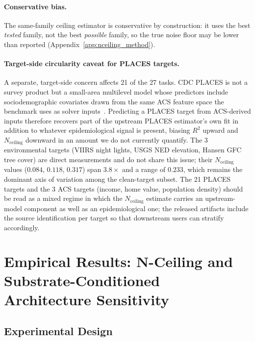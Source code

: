\documentclass{article}
\begin{document}
\paragraph{Conservative bias.} The same-family ceiling estimator is conservative by construction: it uses the best \emph{tested} family, not the best \emph{possible} family, so the true noise floor may be lower than reported (Appendix~\ref{app:nceiling_method}).

\paragraph{Target-side circularity caveat for PLACES targets.} A separate, target-side concern affects 21 of the 27 tasks. CDC PLACES is not a survey product but a small-area multilevel model whose predictors include sociodemographic covariates drawn from the same ACS feature space the benchmark uses as solver inputs~\citep{cdcplaces2025methodology}. Predicting a PLACES target from ACS-derived inputs therefore recovers part of the upstream PLACES estimator's own fit in addition to whatever epidemiological signal is present, biasing $R^2$ upward and $N_{\text{ceiling}}$ downward in an amount we do not currently quantify. The 3 environmental targets (VIIRS night lights, USGS NED elevation, Hansen GFC tree cover) are direct measurements and do not share this issue; their $N_{\text{ceiling}}$ values ($0.084$, $0.118$, $0.317$) span $3.8{\times}$ and a range of $0.233$, which remains the dominant axis of variation among the clean-target subset. The 21 PLACES targets and the 3 ACS targets (income, home value, population density) should be read as a mixed regime in which the $N_{\text{ceiling}}$ estimate carries an upstream-model component as well as an epidemiological one; the released artifacts include the source identification per target so that downstream users can stratify accordingly.

\section{Empirical Results: N-Ceiling and Substrate-Conditioned Architecture Sensitivity}
\label{sec:geo}

\subsection{Experimental Design}
\end{document}
